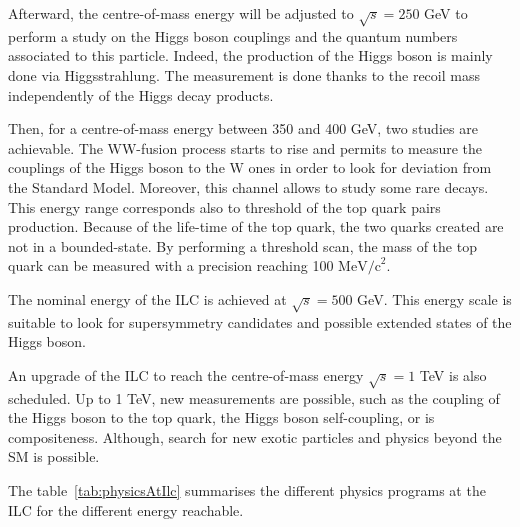    Afterward, the centre-of-mass energy will be adjusted to $\sqrt{s} = 250$ GeV to perform a study on the Higgs boson couplings and the quantum numbers associated to this particle. 
   Indeed, the production of the Higgs boson is mainly done via Higgsstrahlung. 
   The measurement is done thanks to the recoil mass independently of the Higgs decay products.
 
   Then, for a centre-of-mass energy between 350 and 400 GeV, two studies are achievable. 
   The WW-fusion process starts to rise and permits to measure the couplings of the Higgs boson to the W ones in order to look for deviation from the Standard Model. 
   Moreover, this channel allows to study some rare decays. 
   This energy range corresponds also to threshold of the top quark pairs production.
   Because of the life-time of the top quark, the two quarks created are not in a bounded-state. 
   By performing a threshold scan, the mass of the top quark can be measured with a precision reaching 100 $\text{MeV/c}^2$.

   The nominal energy of the \gls{ILC} is achieved at $\sqrt{s} = 500$ GeV.
   This energy scale is suitable to look for supersymmetry candidates and possible extended states of the Higgs boson.

   An upgrade of the ILC to reach the centre-of-mass energy $\sqrt{s} = 1$ TeV is also scheduled.
   Up to 1 TeV, new measurements are possible, such as the coupling of the Higgs boson to the top quark, the Higgs boson self-coupling, or is compositeness.
   Although, search for new exotic particles and physics beyond the \gls{SM} is possible.
    
   The table~\ref{tab:physicsAtIlc} summarises the different physics programs at the ILC for the different energy reachable.  

